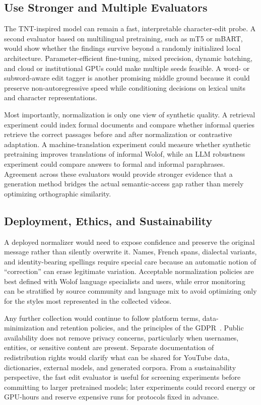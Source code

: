\documentclass[12pt, a4paper, twoside, openany]{report}
\begin{document}
\subsection{Use Stronger and Multiple Evaluators}

The TNT-inspired model can remain a fast, interpretable character-edit probe. A second evaluator based on multilingual pretraining, such as mT5 or mBART, would show whether the findings survive beyond a randomly initialized local architecture. Parameter-efficient fine-tuning, mixed precision, dynamic batching, and cloud or institutional GPUs could make multiple seeds feasible. A word- or subword-aware edit tagger is another promising middle ground because it could preserve non-autoregressive speed while conditioning decisions on lexical units and character representations.

Most importantly, normalization is only one view of synthetic quality. A retrieval experiment could index formal documents and compare whether informal queries retrieve the correct passages before and after normalization or contrastive adaptation. A machine-translation experiment could measure whether synthetic pretraining improves translations of informal Wolof, while an LLM robustness experiment could compare answers to formal and informal paraphrases. Agreement across these evaluators would provide stronger evidence that a generation method bridges the actual semantic-access gap rather than merely optimizing orthographic similarity.

\subsection{Deployment, Ethics, and Sustainability}

A deployed normalizer would need to expose confidence and preserve the original message rather than silently overwrite it. Names, French spans, dialectal variants, and identity-bearing spellings require special care because an automatic notion of ``correction'' can erase legitimate variation. Acceptable normalization policies are best defined with Wolof language specialists and users, while error monitoring can be stratified by source community and language mix to avoid optimizing only for the styles most represented in the collected videos.

Any further collection would continue to follow platform terms, data-minimization and retention policies, and the principles of the GDPR~\cite{gdpr2016}. Public availability does not remove privacy concerns, particularly when usernames, entities, or sensitive content are present. Separate documentation of redistribution rights would clarify what can be shared for YouTube data, dictionaries, external models, and generated corpora. From a sustainability perspective, the fast edit evaluator is useful for screening experiments before committing to larger pretrained models; later experiments could record energy or GPU-hours and reserve expensive runs for protocols fixed in advance.
\end{document}
